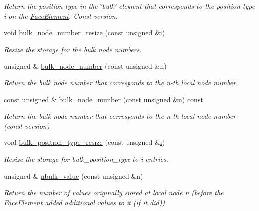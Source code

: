\begin{DoxyCompactItemize}
\begin{DoxyCompactList}\small\item\em Return the position type in the \char`\"{}bulk\char`\"{} element that corresponds to the position type i on the \hyperlink{classoomph_1_1FaceElement}{Face\+Element}. Const version. \end{DoxyCompactList}\item 
void \hyperlink{classoomph_1_1FaceElement_a2f1891fcc8fc36bd263f62a54d792dac}{bulk\+\_\+node\+\_\+number\+\_\+resize} (const unsigned \&\hyperlink{cfortran_8h_adb50e893b86b3e55e751a42eab3cba82}{i})
\begin{DoxyCompactList}\small\item\em Resize the storage for the bulk node numbers. \end{DoxyCompactList}\item 
unsigned \& \hyperlink{classoomph_1_1FaceElement_ae437e62de81be4c4183de872d1119b16}{bulk\+\_\+node\+\_\+number} (const unsigned \&n)
\begin{DoxyCompactList}\small\item\em Return the bulk node number that corresponds to the n-\/th local node number. \end{DoxyCompactList}\item 
const unsigned \& \hyperlink{classoomph_1_1FaceElement_ad520ea8561262ec0adc5d9cb8bd2797e}{bulk\+\_\+node\+\_\+number} (const unsigned \&n) const
\begin{DoxyCompactList}\small\item\em Return the bulk node number that corresponds to the n-\/th local node number (const version) \end{DoxyCompactList}\item 
void \hyperlink{classoomph_1_1FaceElement_a7e6ac88c4dbc58f16e9c7ca60b6b9c0f}{bulk\+\_\+position\+\_\+type\+\_\+resize} (const unsigned \&\hyperlink{cfortran_8h_adb50e893b86b3e55e751a42eab3cba82}{i})
\begin{DoxyCompactList}\small\item\em Resize the storage for bulk\+\_\+position\+\_\+type to i entries. \end{DoxyCompactList}\item 
unsigned \& \hyperlink{classoomph_1_1FaceElement_a58b9a1328c1c991142d58d1202c561e1}{nbulk\+\_\+value} (const unsigned \&n)
\begin{DoxyCompactList}\small\item\em Return the number of values originally stored at local node n (before the \hyperlink{classoomph_1_1FaceElement}{Face\+Element} added additional values to it (if it did)) \end{DoxyCompactList}\item 

\end{DoxyCompactItemize}
